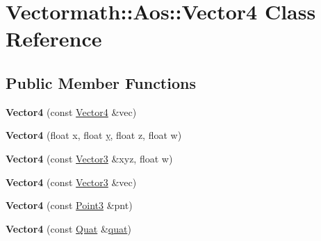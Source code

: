 \hypertarget{class_vectormath_1_1_aos_1_1_vector4}{\section{Vectormath\+:\+:Aos\+:\+:Vector4 Class Reference}
\label{class_vectormath_1_1_aos_1_1_vector4}
}
\subsection*{Public Member Functions}
\begin{DoxyCompactItemize}
\item 
\hypertarget{class_vectormath_1_1_aos_1_1_vector4_ae1761e06fb715a8534084780ee52a438}{{\bfseries Vector4} (const \hyperlink{class_vectormath_1_1_aos_1_1_vector4}{Vector4} \&vec)}\label{class_vectormath_1_1_aos_1_1_vector4_ae1761e06fb715a8534084780ee52a438}

\item 
\hypertarget{class_vectormath_1_1_aos_1_1_vector4_a3a4501d24f6f6c97af5ed98b457215e2}{{\bfseries Vector4} (float x, float \hyperlink{_ice_utils_8h_aa7ffaed69623192258fb8679569ff9ba}{y}, float z, float w)}\label{class_vectormath_1_1_aos_1_1_vector4_a3a4501d24f6f6c97af5ed98b457215e2}

\item 
\hypertarget{class_vectormath_1_1_aos_1_1_vector4_aa01a20cca631ed841fa5e7dc054d3a3b}{{\bfseries Vector4} (const \hyperlink{class_vectormath_1_1_aos_1_1_vector3}{Vector3} \&xyz, float w)}\label{class_vectormath_1_1_aos_1_1_vector4_aa01a20cca631ed841fa5e7dc054d3a3b}

\item 
\hypertarget{class_vectormath_1_1_aos_1_1_vector4_a6294264878da234130bc0e7b932c5d6a}{{\bfseries Vector4} (const \hyperlink{class_vectormath_1_1_aos_1_1_vector3}{Vector3} \&vec)}\label{class_vectormath_1_1_aos_1_1_vector4_a6294264878da234130bc0e7b932c5d6a}

\item 
\hypertarget{class_vectormath_1_1_aos_1_1_vector4_aa9a6005bd217cc94abd52c1265ba6eff}{{\bfseries Vector4} (const \hyperlink{class_vectormath_1_1_aos_1_1_point3}{Point3} \&pnt)}\label{class_vectormath_1_1_aos_1_1_vector4_aa9a6005bd217cc94abd52c1265ba6eff}

\item 
\hypertarget{class_vectormath_1_1_aos_1_1_vector4_a82a4a71383f2b05c053b00a4f13f9dda}{{\bfseries Vector4} (const \hyperlink{class_vectormath_1_1_aos_1_1_quat}{Quat} \&\hyperlink{classquat}{quat})}\label{class_vectormath_1_1_aos_1_1_vector4_a82a4a71383f2b05c053b00a4f13f9dda}


\end{DoxyCompactItemize}
